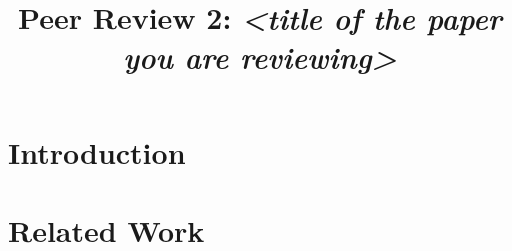 \documentclass[conference,a4paper]{IEEEtran}
\newif\ifguidance
\newcommand{\guidance}[1]{\ifguidance{\itshape\small #1\par\medskip}\fi}
\begin{document}
\title{Peer Review 2: \textit{<title of the paper you are reviewing>}}

\author{
}

\maketitle


\guidance{Every italic note in this document is guidance.
Delete each one as you write its section, then set
\texttt{\textbackslash guidancefalse} in the preamble: the PDF you submit
carries no guidance.

The sections below are the parts of the paper, in the paper's own order. Write
about each one where it belongs: a defect goes in the section it affects.

Reviews are double-blind. Your name stays out of this document. Your
submission on Moodle is what tells the instructor the review is yours. The
instructor numbers the reviews when he forwards them, from the author's side,
so this file being your first review says nothing about the number it arrives
under.

The paper you receive comes without its AI Usage Journal, which the author
wrote and the instructor marks separately, and with an archive holding the
script you are asked to run in Section~IV.

This review carries no score of any kind. Each author receives two reviews of
their paper. Marks reach students in mid-February.}

\section{Introduction}
\guidance{What question does the paper set out to answer, and does the paper
answer it? Take the claims the introduction makes and say whether the rest of
the paper supports them.}

\section{Related Work}
\guidance{Check the references. Do they exist, and do they say what they are
cited for? Then judge whether the section situates the author's own
contribution, or only lists other people's.}
\end{document}
